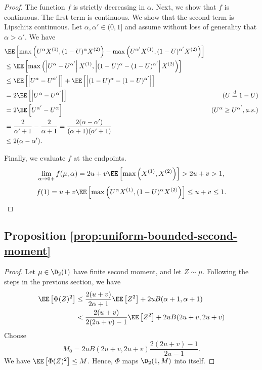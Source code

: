 \begin{proof}
  The function $f$ is strictly decreasing in $\alpha$. Next, we show that $f$ is continuous. The first term is continuous. We show that the second term is Lipschitz continuous. Let $\alpha, \alpha' \in (0,1]$ and assume without loss of generality that $\alpha > \alpha'$. We have
  \begin{align*}
     & \EE\left[\max\left(U^\alpha X^{(1)}, (1-U)^\alpha X^{(2)}\right) - \max\left(U^{\alpha'} X^{(1)}, (1-U)^{\alpha'} X^{(2)}\right)\right] \\
     & \le \EE\left[\max\left(\left|U^\alpha - U^{\alpha'}\right|X^{(1)}, \left|(1-U)^\alpha - (1-U)^{\alpha'}\right|X^{(2)}\right)\right]     \\
     & \le \EE\left[\left|U^\alpha - U^{\alpha'}\right|\right] + \EE\left[\left|(1-U)^\alpha - (1-U)^{\alpha'}\right|\right]                   \\
     & = 2\EE\left[\left|U^\alpha - U^{\alpha'}\right|\right]
     & \text{($U \stackrel{d}{=} 1-U$)}                                                                                                        \\
     & = 2\EE\left[U^{\alpha'} - U^{\alpha}\right]
     & \text{($U^\alpha\ge U^{\alpha'}, a.s.$)}                                                                                                \\
     & = \dfrac{2}{\alpha'+1} - \dfrac{2}{\alpha+1} = \dfrac{2(\alpha-\alpha')}{(\alpha+1)(\alpha'+1)}                                         \\
     & \le 2(\alpha-\alpha').
  \end{align*}

  Finally, we evaluate $f$ at the endpoints.
  $$\lim_{\alpha \to 0+} f(\mu, \alpha) = 2u+v\EE\left[\max\left(X^{(1)}, X^{(2)}\right)\right] > 2u+v > 1,$$
  $$f(1) = u + v\EE\left[\max\left(U^\alpha X^{(1)}, (1-U)^\alpha X^{(2)}\right)\right] \le u+v \le 1.$$
\end{proof}

\subsection{Proposition \ref{prop:uniform-bounded-second-moment}}
\label{subsec:proof-prop-phi}

\begin{proof}
  Let $\mu\in\D_2(1)$ have finite second moment, and let $Z\sim \mu$. Following the steps in the previous section, we have
  \begin{align*}
    \EE\left[\Phi(Z)^2\right]
     & \le \dfrac{2(u+v)}{2\alpha+1}\EE\left[Z^2\right] + 2uB(\alpha+1, \alpha+1) \\
     & < \dfrac{2(u+v)}{2(2u+v)-1}\EE\left[Z^2\right] + 2uB(2u+v, 2u+v)           \\
  \end{align*}
  Choose
  $$M_0 = 2uB(2u+v, 2u+v)\dfrac{2(2u+v)-1}{2u-1}.$$
  We have $\EE\left[\Phi(Z)^2\right] \le M$. Hence, $\Phi$ maps $\D_2(1, M)$ into itself.
\end{proof}

